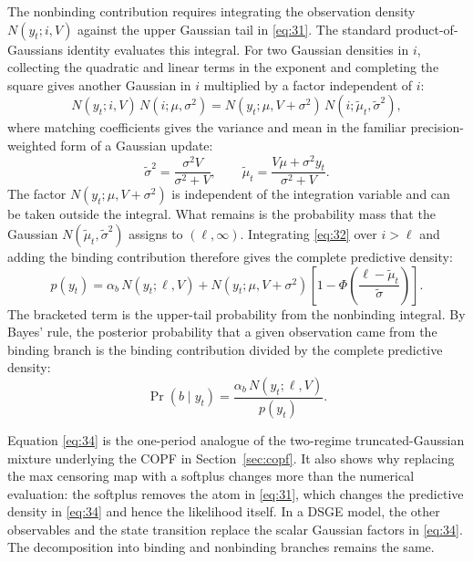 \documentclass[11pt]{article}
\begin{document}
The nonbinding contribution requires integrating the observation density $N(y_t;i,V)$ against the upper Gaussian tail in \eqref{eq:31}. The standard product-of-Gaussians identity evaluates this integral. For two Gaussian densities in $i$, collecting the quadratic and linear terms in the exponent and completing the square gives another Gaussian in $i$ multiplied by a factor independent of $i$:
\begin{equation}\label{eq:32}
 N(y_t;i,V)\,N(i;\mu,\sigma^2)
 =N(y_t;\mu,V+\sigma^2)\,N(i;\widetilde\mu_t,\widetilde\sigma^2),
\end{equation}
where matching coefficients gives the variance and mean in the familiar precision-weighted form of a Gaussian update:
\begin{equation}\label{eq:33}
 \widetilde\sigma^2=\frac{\sigma^2V}{\sigma^2+V},
 \qquad
 \widetilde\mu_t=\frac{V\mu+\sigma^2y_t}{\sigma^2+V}.
\end{equation}
The factor $N(y_t;\mu,V+\sigma^2)$ is independent of the integration variable and can be taken outside the integral. What remains is the probability mass that the Gaussian $N(\widetilde\mu_t,\widetilde\sigma^2)$ assigns to $(\ell,\infty)$. Integrating \eqref{eq:32} over $i>\ell$ and adding the binding contribution therefore gives the complete predictive density:
\begin{equation}\label{eq:34}
 p(y_t)=
 \alpha_b\,N(y_t;\ell,V)
 +N(y_t;\mu,V+\sigma^2)
  \left[1-\Phi\!\left(
   \frac{\ell-\widetilde\mu_t}{\widetilde\sigma}\right)\right].
\end{equation}
The bracketed term is the upper-tail probability from the nonbinding integral. By Bayes' rule, the posterior probability that a given observation came from the binding branch is the binding contribution divided by the complete predictive density:
\begin{equation}\label{eq:35}
 \Pr(b\mid y_t)=
 \frac{\alpha_b\,N(y_t;\ell,V)}{p(y_t)}.
\end{equation}

Equation \eqref{eq:34} is the one-period analogue of the two-regime truncated-Gaussian mixture underlying the COPF in Section~\ref{sec:copf}. It also shows why replacing the max censoring map with a softplus changes more than the numerical evaluation: the softplus removes the atom in \eqref{eq:31}, which changes the predictive density in \eqref{eq:34} and hence the likelihood itself. In a DSGE model, the other observables and the state transition replace the scalar Gaussian factors in \eqref{eq:34}. The decomposition into binding and nonbinding branches remains the same.
\end{document}
